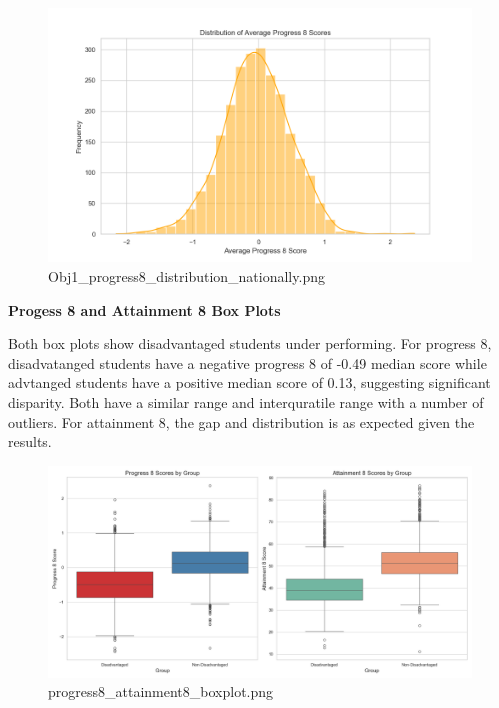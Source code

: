 \documentclass[
  letterpaper,
  DIV=11,
  numbers=noendperiod]{scrartcl}
\begin{document}
\begin{figure}[H]

{\centering \includegraphics{P4DS_A2_Data_Analysis_Project_files/figure-pdf/cell-191-1-Obj1_progress8_distribution_nationally.png}

}

\caption{Obj1\_progress8\_distribution\_nationally.png}

\end{figure}%

\textbf{Progess 8 and Attainment 8 Box Plots}

Both box plots show disadvantaged students under performing. For
progress 8, disadvatanged students have a negative progress 8 of -0.49
median score while advtanged students have a positive median score of
0.13, suggesting significant disparity. Both have a similar range and
interquratile range with a number of outliers. For attainment 8, the gap
and distribution is as expected given the results.

\begin{figure}[H]

{\centering \includegraphics{P4DS_A2_Data_Analysis_Project_files/figure-pdf/cell-191-3-progress8_attainment8_boxplot.png}

}

\caption{progress8\_attainment8\_boxplot.png}

\end{figure}%
\end{document}
